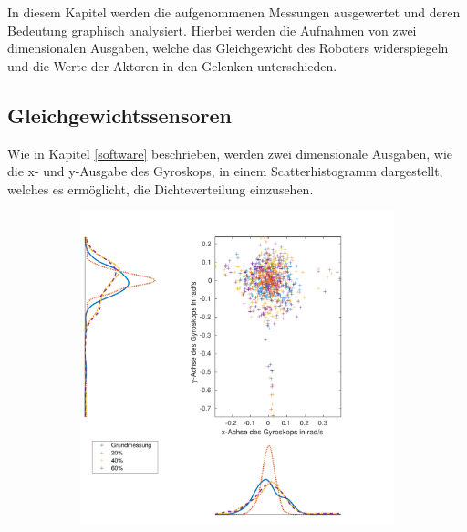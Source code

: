 In diesem Kapitel werden die aufgenommenen Messungen ausgewertet und deren Bedeutung graphisch analysiert. Hierbei werden die Aufnahmen von zwei dimensionalen Ausgaben, welche das Gleichgewicht des Roboters widerspiegeln und die Werte der Aktoren in den Gelenken unterschieden.

\subsection{Gleichgewichtssensoren}

Wie in Kapitel \ref{software} beschrieben, werden zwei dimensionale Ausgaben, wie die x- und y-Ausgabe des Gyroskops, in einem Scatterhistogramm dargestellt, welches es ermöglicht, die Dichteverteilung einzusehen. 

\begin{figure}[b!]
	\centering
	\begin{adjustwidth}{-0.2\linewidth}{-0.2\linewidth}
		\hspace{+35pt}
		\begin{subfigure}[c]{.5\linewidth}
			\centering
			\includegraphics[width=\linewidth]{Bilder/Gyr_Grund_20_40_60_ohneM.pdf}
			\vspace{5pt}
		\end{subfigure}
		\hspace{-35pt}
		\begin{subfigure}[c]{.5\linewidth}

\end{subfigure}
\end{adjustwidth}
\end{figure}
